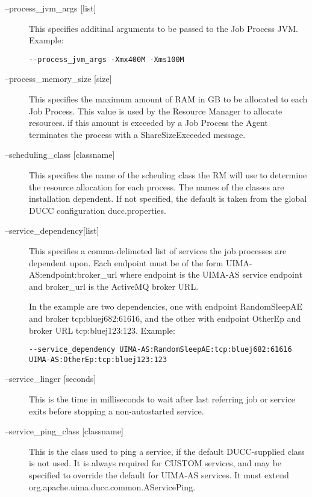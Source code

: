 \begin{description}
      \item[--process\_jvm\_args {[list]}] 
        This specifies additinal arguments to be passed to the Job Process JVM. Example: 
\begin{verbatim}
--process_jvm_args -Xmx400M -Xms100M 
\end{verbatim}
        
      \item[--process\_memory\_size {[size]}] This specifies the maximum amount of RAM in GB to be
        allocated to each Job Process.  This value is used by the Resource Manager to allocate
        resources. if this amount is exceeded by a Job Process the Agent terminates the process with
        a ShareSizeExceeded message.

      \item[--scheduling\_class {[classname]}] This specifies the name of the scheuling class the RM
        will use to determine the resource allocation for each process. The names of the classes are
        installation dependent. If not specified, the default is taken from the global DUCC
        configuration ducc.properties. 

      \item[--service\_dependency{[list]}] This specifies a comma-delimeted list of services the job
        processes are dependent upon.  Each endpoint must be of the form UIMA-AS:endpoint:broker\_url
        where endpoint is the UIMA-AS service endpoint and broker\_url is the ActiveMQ broker URL.

        In the example are two dependencies, one with endpoint RandomSleepAE and broker
        tcp:bluej682:61616, and the other with endpoint OtherEp and broker URL
        tcp:bluej123:123. Example:
\begin{verbatim}
--service_dependency UIMA-AS:RandomSleepAE:tcp:bluej682:61616 UIMA-AS:OtherEp:tcp:bluej123:123 
\end{verbatim}

      \item[--service\_linger {[seconds]}] This is the time in milliseconds to wait after last
        referring job or service exits before stopping a non-autostarted service.

      \item[--service\_ping\_class {[classname]}] This is the class used to ping a service, if the
        default DUCC-supplied class is not used.  It is always required for CUSTOM services, and
        may be specified to override the default for UIMA-AS services.  It must extend
        org.apache.uima.ducc.common.AServicePing.


\end{description}
